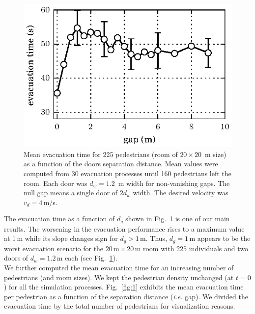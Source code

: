 \begin{figure}
\includegraphics[width=\columnwidth]{./fig8.eps}
\caption{\label{fig:13} Mean evacuation time for 225 pedestrians (room of 
$20\times20$~m size) as a function of the doors separation distance. Mean 
values were computed from 30 evacuation processes until 160 pedestrians left 
the room. Each door was $d_w=1.2$~m width for non-vanishing gaps. The null gap 
means a single door of $2d_w$ width. The desired velocity was $v_d=4\,$m/s. }
\end{figure}

The evacuation time as a function of $d_g$ shown in Fig.~\ref{fig:13} is one 
of our main results. The worsening in the evacuation performance rises to a 
maximum value at $1\,$m while its slope changes sign for $d_g>1\,$m. Thus, 
$d_g=1\,$m appears to be the worst evacuation scenario for the 
$20\,\mathrm{m}\times20\,\mathrm{m}$ room with 225 individuals and two 
doors of $d_w=1.2\,$m each (see Fig.~\ref{fig:13}).  \\


We further computed the mean evacuation time for an increasing number of 
pedestrians (and room sizes). We kept the pedestrian density unchanged (at 
$t=0$) for all the simulation processes. Fig.~\ref{fig:1} exhibits the mean 
evacuation time per pedestrian as a function of the separation distance 
(\emph{i.e.} gap). We divided the evacuation time by the total number of 
pedestrians for visualization reasons. \\


